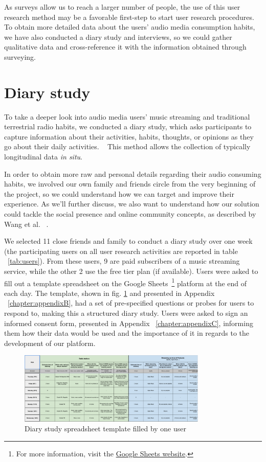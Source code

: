 As surveys allow us to reach a larger number of people, the use of this user research method may be a favorable first-step to start user research procedures. To obtain more detailed data about the users' audio media consumption habits, we have also conducted a diary study and interviews, so we could gather qualitative data and cross-reference it with the information obtained through surveying.

\section{Diary study}

To take a deeper look into audio media users' music streaming and traditional terrestrial radio habits, we conducted a diary study, which asks participants to capture information about their activities, habits, thoughts, or opinions as they go about their daily activities. ~\cite{Courage2005} This method allows the collection of typically longitudinal data \textit{in situ}. 

In order to obtain more raw and personal details regarding their audio consuming habits, we involved our own family and friends circle from the very beginning of the project, so we could understand how we can target and improve their experience. As we'll further discuss, we also want to understand how our solution could tackle the social presence and online community concepts, as described by Wang et al. ~\cite{Wang2014}.

We selected 11 close friends and family to conduct a diary study over one week (the participating users on all user research activities are reported in table ~\ref{tab:users}). From these users, 9 are paid subscribers of a music streaming service, while the other 2 use the free tier plan (if available). Users were asked to fill out a template spreadsheet on the Google Sheets~\footnote{For more information, visit the \href{http://sheets.google.com/}{Google Sheets website}.} platform at the end of each day. The template, shown in fig. \ref{fig:diarystudy} and presented in Appendix ~\ref{chapter:appendixB}, had a set of pre-specified questions or probes for users to respond to, making this a structured diary study. Users were asked to sign an informed consent form, presented in Appendix ~\ref{chapter:appendixC}, informing them how their data would be used and the importance of it in regards to the development of our platform.


\begin{figure}[h]
\centering
\includegraphics[width=0.8\textwidth]{./Images/diarystudy.png}
\caption{Diary study spreadsheet template filled by one user}
\label{fig:diarystudy}
\end{figure}


